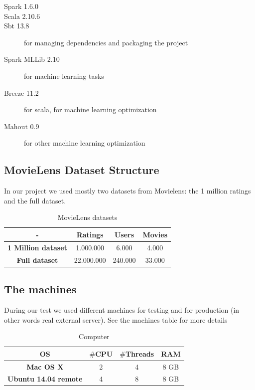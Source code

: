 \documentclass{sig-alternate-05-2015}
\begin{document}
\begin{description}
    \item[Spark 1.6.0]
    \item[Scala 2.10.6]
    \item[Sbt 13.8] for managing dependencies and packaging the project
    \item[Spark MLLib 2.10] for machine learning tasks
    \item[Breeze 11.2] for scala, for machine learning optimization
    \item[Mahout 0.9] for other machine learning optimization

\end{description}

\subsection{MovieLens Dataset Structure}
In our project we used mostly two datasets from Movielens: the 1 million ratings
and the full dataset.
\begin{table}
\centering
\caption{MovieLens datasets}
\begin{tabular}{|c|c|c|c|} \hline
-  & \textbf{Ratings} & \textbf{Users} & \textbf{Movies}\\ \hline
\textbf{1 Million dataset} & 1.000.000 & 6.000 & 4.000 \\ \hline
\textbf{Full dataset} & 22.000.000 & 240.000 & 33.000  \\ \hline
\end{tabular}
\end{table}


\subsection{The machines}
During our test we used different machines for testing and for production (in other
words real external server). See the machines table for more details\\
\begin{table}
\centering
\caption{Computer}
\begin{tabular}{|c|c|c|c|} \hline
\textbf{OS} & \textbf{$\#$CPU} & \textbf{$\#$Threads} & \textbf{RAM}\\ \hline
\textbf{Mac OS X} & 2 & 4 & 8 GB \\ \hline
\textbf{Ubuntu 14.04 remote} & 4 & 8 & 8 GB  \\ \hline
\end{tabular}
\end{table}
\end{document}
